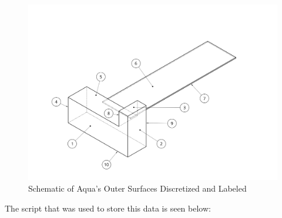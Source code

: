 \begin{figure}[H]
    \centering
    \includegraphics[width = 14cm]{Images/AquaSurfaces.png}
    \caption{Schematic of Aqua's Outer Surfaces Discretized and Labeled}
    \label{fig:surface_labels}
\end{figure}

The script that was used to store this data is seen below:


